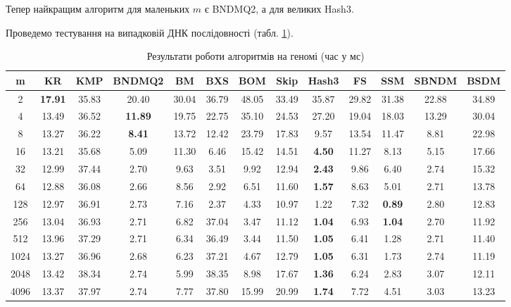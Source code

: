 \documentclass[a4paper,14pt]{extarticle} %
\begin{document}
				Тепер найкращим алгоритм для маленьких $m$ є BNDMQ2, а для великих Hash3.

				Проведемо тестування на випадковій ДНК послідовності (табл. \ref{table:dna_results}).
				\begin{table}[H]
					\centering
					\scriptsize
					\begin{tabular}{|c|c|c|c|c|c|c|c|c|c|c|c|c|}
					\hline
					\textbf{m} & \textbf{KR} & \textbf{KMP} & \textbf{BNDMQ2} & \textbf{BM} & \textbf{BXS} & \textbf{BOM} & \textbf{Skip} & \textbf{Hash3} & \textbf{FS} & \textbf{SSM} & \textbf{SBNDM} & \textbf{BSDM} \\
					\hline
					2 & \textbf{17.91} & 35.83 & 20.40 & 30.04 & 36.79 & 48.05 & 33.49 & 35.87 & 29.82 & 31.38 & 22.88 & 34.89 \\
					\hline
					4 & 13.49 & 36.52 & \textbf{11.89} & 19.75 & 22.75 & 35.10 & 24.53 & 27.20 & 19.04 & 18.03 & 13.29 & 30.04 \\
					\hline
					8 & 13.27 & 36.22 & \textbf{8.41} & 13.72 & 12.42 & 23.79 & 17.83 & 9.57 & 13.54 & 11.47 & 8.81 & 22.98 \\
					\hline
					16 & 13.21 & 35.68 & 5.09 & 11.30 & 6.46 & 15.42 & 14.51 & \textbf{4.50} & 11.27 & 8.13 & 5.15 & 17.66 \\
					\hline
					32 & 12.99 & 37.44 & 2.70 & 9.63 & 3.51 & 9.92 & 12.94 & \textbf{2.43} & 9.86 & 6.40 & 2.74 & 15.32 \\
					\hline
					64 & 12.88 & 36.08 & 2.66 & 8.56 & 2.92 & 6.51 & 11.60 & \textbf{1.57} & 8.63 & 5.01 & 2.71 & 13.78 \\
					\hline
					128 & 12.97 & 36.91 & 2.73 & 7.16 & 2.37 & 4.33 & 10.97 & 1.22 & 7.32 & \textbf{0.89} & 2.80 & 12.83 \\
					\hline
					256 & 13.04 & 36.93 & 2.71 & 6.82 & 37.04 & 3.47 & 11.12 & \textbf{1.04} & 6.93 & \textbf{1.04} & 2.70 & 11.92 \\
					\hline
					512 & 13.96 & 37.29 & 2.71 & 6.34 & 36.49 & 3.44 & 11.50 & \textbf{1.05} & 6.41 & 1.28 & 2.71 & 11.40 \\
					\hline
					1024 & 13.27 & 36.96 & 2.68 & 6.23 & 37.21 & 4.67 & 12.79 & \textbf{1.05} & 6.31 & 1.73 & 2.74 & 11.19 \\
					\hline
					2048 & 13.42 & 38.34 & 2.74 & 5.99 & 38.35 & 8.98 & 17.67 & \textbf{1.36} & 6.24 & 2.83 & 3.07 & 12.11 \\
					\hline
					4096 & 13.37 & 37.97 & 2.74 & 7.77 & 37.80 & 15.99 & 20.99 & \textbf{1.74} & 7.72 & 4.51 & 3.03 & 13.23 \\
					\hline
					\end{tabular}
					\caption{Результати роботи алгоритмів на геномі (час у мс)}
					\label{table:dna_results}
					\end{table}
\end{document}
